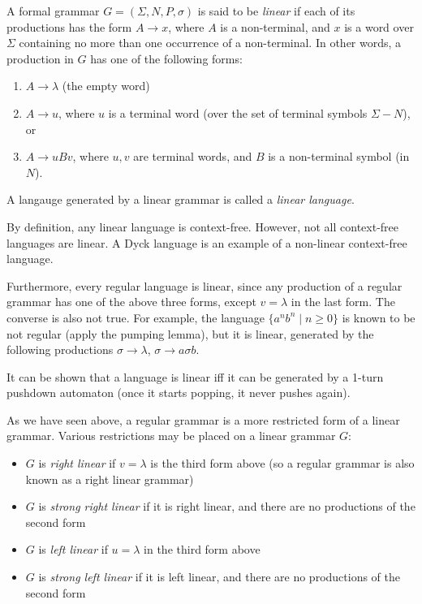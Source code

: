 \documentclass[12pt]{article}
\begin{document}
A formal grammar $G=(\Sigma,N,P,\sigma)$ is said to be \emph{linear} if each of its productions has the form $A\to x$, where $A$ is a non-terminal, and $x$ is a word over $\Sigma$ containing no more than one occurrence of a non-terminal.  In other words, a production in $G$ has one of the following forms:
\begin{enumerate}
\item $A\to \lambda$ (the empty word)
\item $A\to u$, where $u$ is a terminal word (over the set of terminal symbols $\Sigma-N$), or
\item $A\to uBv$, where $u,v$ are terminal words, and $B$ is a non-terminal symbol (in $N$).
\end{enumerate}

A langauge generated by a linear grammar is called a \emph{linear language}.

By definition, any linear language is context-free.  However, not all context-free languages are linear.  A Dyck language is an example of a non-linear context-free language.

Furthermore, every regular language is linear, since any production of a regular grammar has one of the above three forms, except $v=\lambda$ in the last form.  The converse is also not true.  For example, the language $\lbrace a^n b^n \mid n \ge 0\rbrace$ is known to be not regular (apply the pumping lemma), but it is linear, generated by the following productions $\sigma \to \lambda$, $\sigma \to a\sigma b$.

It can be shown that a language is linear iff it can be generated by a 1-turn pushdown automaton (once it starts popping, it never pushes again).

As we have seen above, a regular grammar is a more restricted form of a linear grammar.  Various restrictions may be placed on a linear grammar $G$:
\begin{itemize}
\item $G$ is \emph{right linear} if $v=\lambda$ is the third form above (so a regular grammar is also known as a right linear grammar)
\item $G$ is \emph{strong right linear} if it is right linear, and there are no productions of the second form
\item $G$ is \emph{left linear} if $u=\lambda$ in the third form above
\item $G$ is \emph{strong left linear} if it is left linear, and there are no productions of the second form
\end{itemize}
\end{document}

